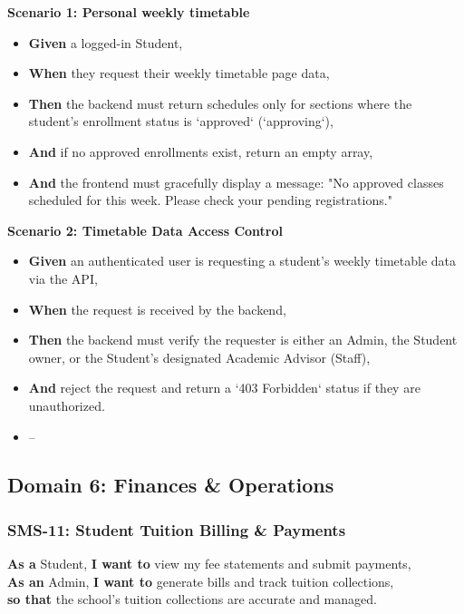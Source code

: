 \noindent\textbf{Scenario 1: Personal weekly timetable}\\
\begin{itemize}
  \item \textbf{Given} a logged-in Student,
  \item \textbf{When} they request their weekly timetable page data,
  \item \textbf{Then} the backend must return schedules only for sections where the student's enrollment status is `approved` (`approving`),
  \item \textbf{And} if no approved enrollments exist, return an empty array,
  \item \textbf{And} the frontend must gracefully display a message: "No approved classes scheduled for this week. Please check your pending registrations."
\end{itemize}


\noindent\textbf{Scenario 2: Timetable Data Access Control}\\
\begin{itemize}
  \item \textbf{Given} an authenticated user is requesting a student's weekly timetable data via the API,
  \item \textbf{When} the request is received by the backend,
  \item \textbf{Then} the backend must verify the requester is either an Admin, the Student owner, or the Student's designated Academic Advisor (Staff),
  \item \textbf{And} reject the request and return a `403 Forbidden` status if they are unauthorized.
\end{itemize}

\begin{itemize}
  \item --
\end{itemize}

\subsection{Domain 6: Finances \& Operations}

\subsubsection{SMS-11: Student Tuition Billing \& Payments}
\noindent \textbf{As a} Student, \textbf{I want to} view my fee statements and submit payments, \\
\noindent \textbf{As an} Admin, \textbf{I want to} generate bills and track tuition collections, \\
\noindent \textbf{so that} the school's tuition collections are accurate and managed. \\



